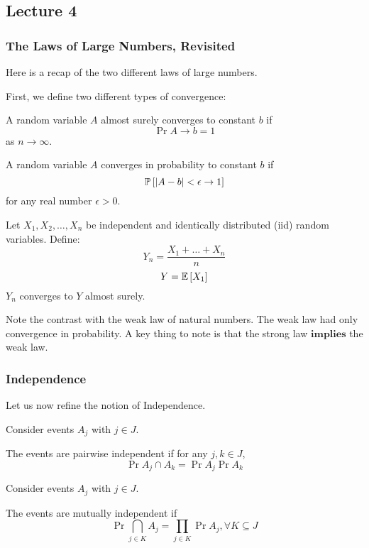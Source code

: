 \subsection{Lecture 4}

\subsubsection{The Laws of Large Numbers, Revisited}
Here is a recap of the two different laws of large numbers.

First, we define two different types of convergence:
\begin{definition} 
    A random variable $A$ almost surely converges to constant $b$ if
    \[\Pr{A \to b} = 1 \]
    as $n \to \infty$.
\end{definition}

\begin{definition}
    A random variable $A$ converges in probability to constant $b$ if
    \[ \mathbb{P}\left[ \abs{A - b} < \epsilon \to 1 \right] \]
    for any real number $\epsilon > 0$.
\end{definition}

\begin{theorem} 
    Let $X_1, X_2, \dots, X_n$ be independent and identically distributed (iid)
    random variables. Define:
    \[ Y_n = \frac{X_1 + \dots + X_n}{n} \]
    \[ Y = \mathbb{E}\left[ X_1 \right] \]
    $Y_n$ converges to $Y$ almost surely.
\end{theorem}

Note the contrast with the weak law of natural numbers. The weak law had only convergence in probability.
A key thing to note is that the strong law $\textbf{implies}$ the weak law.

\subsubsection{Independence}
Let us now refine the notion of Independence.

\begin{definition} 
    Consider events $A_j$ with $j \in J$.

    The events are pairwise independent if for any $j, k \in J$,
    \[\Pr{A_j \cap A_k} = \Pr{A_j} \Pr{A_k}\]
\end{definition}

\begin{definition} 
    Consider events $A_j$ with $j \in J$.

    The events are mutually independent if 
    \[\Pr{\bigcap_{j \in K} A_j} = \prod_{j \in K} \Pr{A_j}, \forall K \subseteq J \]
\end{definition}

